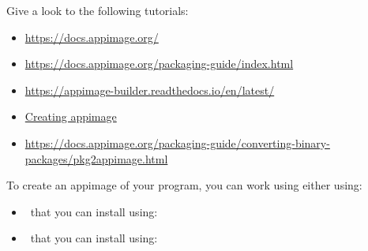 Give a look to the following tutorials:
\begin{itemize}
\item \href{https://docs.appimage.org/}{https://docs.appimage.org/}
\item \href{https://docs.appimage.org/packaging-guide/index.html}{https://docs.appimage.org/packaging-guide/index.html}
\item \href{https://appimage-builder.readthedocs.io/en/latest/}{https://appimage-builder.readthedocs.io/en/latest/}
\item \href{https://github.com/AppImage/AppImageKit/wiki/Creating-AppImages/cc2441518975caca23e9ce2dba6f08a22c678d1e}{Creating appimage}
\item \href{https://docs.appimage.org/packaging-guide/converting-binary-packages/pkg2appimage.html}{https://docs.appimage.org/packaging-guide/converting-binary-packages/pkg2appimage.html}
\end{itemize}
\vspace{0.25cm}
To create an appimage of your program, you can work using either using:
\vspace{0.25cm}
\begin{itemize}

\item \abuild\ that you can install using:
{}
\item \pbuild\ that you can install using:
{}
\end{itemize}

